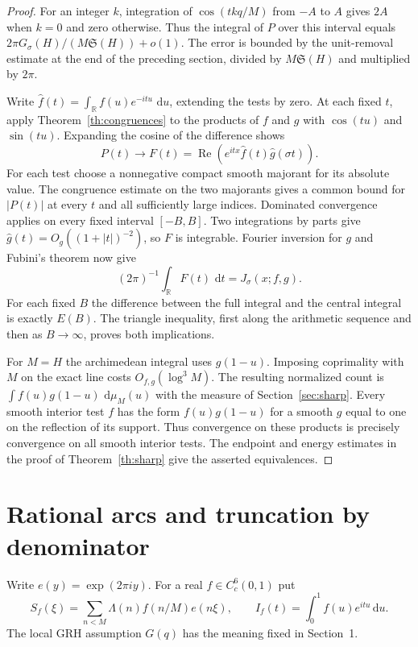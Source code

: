 \documentclass[11pt,a4paper]{article}
\newcommand{\SSg}{\mathfrak S}
\newcommand{\dd}{\,\mathrm d}
\DeclareMathOperator{\Rea}{Re}
\begin{document}
\begin{proof}
For an integer $k$, integration of $\cos(tkq/M)$ from $-A$ to $A$
gives $2A$ when $k=0$ and zero otherwise. Thus the integral of $P$
over this interval equals $2\pi G_\sigma(H)/(M\SSg(H))+o(1)$.
The error is bounded by the unit-removal estimate at the end of the
preceding section, divided by $M\SSg(H)$ and multiplied by $2\pi$.

Write $\widehat f(t)=\int_\mathbb R f(u)e^{-itu}\,\dd u$, extending
the tests by zero. At each fixed $t$, apply
Theorem~\ref{th:congruences} to the products of $f$ and $g$ with
$\cos(tu)$ and $\sin(tu)$. Expanding the cosine of the difference
shows
\[
 P(t)\longrightarrow
 F(t)=\Rea\!\left(e^{itx}\widehat f(t)\widehat g(\sigma t)\right).
\]
For each test choose a nonnegative compact smooth majorant for its
absolute value. The congruence estimate on the two majorants gives
a common bound for $|P(t)|$ at every $t$ and all sufficiently large
indices. Dominated convergence applies on every fixed interval
$[-B,B]$. Two integrations by parts give
$\widehat g(t)=O_g((1+|t|)^{-2})$, so $F$ is integrable.
Fourier inversion for $g$ and Fubini's theorem now give
\[
 (2\pi)^{-1}\int_\mathbb R F(t)\,\dd t=J_\sigma(x;f,g).
\]
For each fixed $B$ the difference between the full integral and the
central integral is exactly $E(B)$. The triangle inequality, first
along the arithmetic sequence and then as $B\to\infty$, proves both
implications.

For $M=H$ the archimedean integral uses $g(1-u)$. Imposing
coprimality with $M$ on the exact line costs $O_{f,g}(\log^3 M)$.
The resulting normalized count is
$\int f(u)g(1-u)\,\dd\mu_M(u)$ with the measure of
Section~\ref{sec:sharp}. Every smooth interior test $f$ has the form
$f(u)g(1-u)$ for a smooth $g$ equal to one on the reflection of its
support. Thus convergence on these products is precisely convergence
on all smooth interior tests. The endpoint and energy estimates in
the proof of Theorem~\ref{th:sharp} give the asserted equivalences.
\end{proof}

\section{Rational arcs and truncation by denominator}\label{sec:arcs}

Write $e(y)=\exp(2\pi i y)$. For a real $f\in C_c^6(0,1)$ put
\[
 S_f(\xi)=\sum_{n<M}\Lambda(n)f(n/M)e(n\xi),\qquad
 I_f(t)=\int_0^1 f(u)e^{itu}\dd u .
\]
The local GRH assumption $G(q)$ has the meaning fixed in Section~1.
\end{document}
